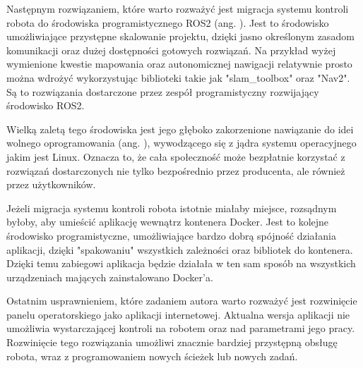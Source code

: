Następnym rozwiązaniem, które warto rozważyć jest migracja systemu kontroli robota do środowiska programistycznego ROS2 (ang. ). Jest to środowisko umożliwiające przystępne skalowanie projektu, dzięki jasno określonym zasadom komunikacji oraz dużej dostępności gotowych rozwiązań. Na przykład wyżej wymienione kwestie mapowania oraz autonomicznej nawigacji relatywnie prosto można wdrożyć wykorzystując biblioteki takie jak "slam\_toolbox" oraz "Nav2". Są to rozwiązania dostarczone przez zespół programistyczny rozwijający środowisko ROS2. 

Wielką zaletą tego środowiska jest jego głęboko zakorzenione nawiązanie do idei wolnego oprogramowania (ang. ), wywodzącego się z jądra systemu operacyjnego jakim jest Linux. Oznacza to, że cała społeczność może bezpłatnie korzystać z rozwiązań dostarczonych nie tylko bezpośrednio przez producenta, ale również przez użytkowników. 

Jeżeli migracja systemu kontroli robota istotnie miałaby miejsce, rozsądnym byłoby, aby umieścić aplikację wewnątrz kontenera Docker. Jest to kolejne środowisko programistyczne, umożliwiające bardzo dobrą spójność działania aplikacji, dzięki "spakowaniu" wszystkich zależności oraz bibliotek do kontenera. Dzięki temu zabiegowi aplikacja będzie działała w ten sam sposób na wszystkich urządzeniach mających zainstalowano Docker'a. 




Ostatnim usprawnieniem, które zadaniem autora warto rozważyć jest rozwinięcie panelu operatorskiego jako aplikacji internetowej. Aktualna wersja aplikacji nie umożliwia wystarczającej kontroli na robotem oraz nad parametrami jego pracy. Rozwinięcie tego rozwiązania umożliwi znacznie bardziej przystępną obsługę robota, wraz z programowaniem nowych ścieżek lub nowych zadań.
